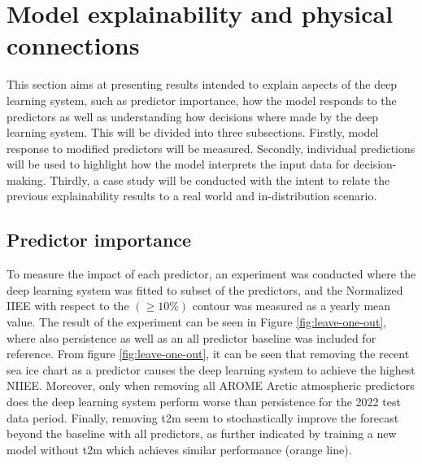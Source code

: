 \documentclass[../main/thesis.tex]{subfiles}
\begin{document}
\section{Model explainability and physical connections}
\label{sec:physical-connections}
This section aims at presenting results intended to explain aspects of the deep learning system, such as predictor importance, how the model responds to the predictors as well as understanding how decisions where made by the deep learning system. This will be divided into three subsections. Firstly, model response to modified predictors will be measured. Secondly, individual predictions will be used to highlight how the model interprets the input data for decision-making. Thirdly, a case study will be conducted with the intent to relate the previous explainability results to a real world and in-distribution scenario.

\subsection{Predictor importance}
\label{sec:predictor-importance}
To measure the impact of each predictor, an experiment was conducted where the deep learning system was fitted to subset of the predictors, and the Normalized IIEE with respect to the $(\geq 10\%)$ contour was measured as a yearly mean value. The result of the experiment can be seen in Figure \ref{fig:leave-one-out}, where also persistence as well as an all predictor baseline was included for reference. From figure \ref{fig:leave-one-out}, it can be seen that removing the recent sea ice chart as a predictor causes the deep learning system to achieve the highest NIIEE. Moreover, only when removing all AROME Arctic atmospheric predictors does the deep learning system perform worse than persistence for the 2022 test data period. Finally, removing t2m seem to stochastically improve the forecast beyond the baseline with all predictors, as further indicated by training a new model without t2m which achieves similar performance (orange line). 
\end{document}
